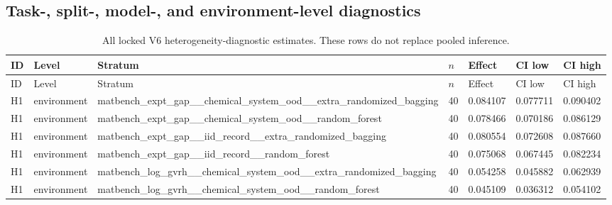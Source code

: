 \documentclass[10pt]{article}
\begin{document}
\begin{landscape}

\section{Task-, split-, model-, and environment-level diagnostics}

\begingroup\scriptsize
\begin{longtable}{L{.35in}L{.6in}L{3.55in}L{.4in}L{.88in}L{.88in}L{.88in}}
\caption{All locked V6 heterogeneity-diagnostic estimates. These rows do not replace pooled inference.}\\
\toprule
ID & Level & Stratum & $n$ & Effect & CI low & CI high\\
\midrule
\endfirsthead
\toprule
ID & Level & Stratum & $n$ & Effect & CI low & CI high\\
\midrule
\endhead
H1 & environment & matbench\_\allowbreak{}expt\_\allowbreak{}gap\_\allowbreak{}\_\allowbreak{}chemical\_\allowbreak{}system\_\allowbreak{}ood\_\allowbreak{}\_\allowbreak{}extra\_\allowbreak{}randomized\_\allowbreak{}bagging & 40 & 0.084107 & 0.077711 & 0.090402\\
H1 & environment & matbench\_\allowbreak{}expt\_\allowbreak{}gap\_\allowbreak{}\_\allowbreak{}chemical\_\allowbreak{}system\_\allowbreak{}ood\_\allowbreak{}\_\allowbreak{}random\_\allowbreak{}forest & 40 & 0.078466 & 0.070186 & 0.086129\\
H1 & environment & matbench\_\allowbreak{}expt\_\allowbreak{}gap\_\allowbreak{}\_\allowbreak{}iid\_\allowbreak{}record\_\allowbreak{}\_\allowbreak{}extra\_\allowbreak{}randomized\_\allowbreak{}bagging & 40 & 0.080554 & 0.072608 & 0.087660\\
H1 & environment & matbench\_\allowbreak{}expt\_\allowbreak{}gap\_\allowbreak{}\_\allowbreak{}iid\_\allowbreak{}record\_\allowbreak{}\_\allowbreak{}random\_\allowbreak{}forest & 40 & 0.075068 & 0.067445 & 0.082234\\
H1 & environment & matbench\_\allowbreak{}log\_\allowbreak{}gvrh\_\allowbreak{}\_\allowbreak{}chemical\_\allowbreak{}system\_\allowbreak{}ood\_\allowbreak{}\_\allowbreak{}extra\_\allowbreak{}randomized\_\allowbreak{}bagging & 40 & 0.054258 & 0.045882 & 0.062939\\
H1 & environment & matbench\_\allowbreak{}log\_\allowbreak{}gvrh\_\allowbreak{}\_\allowbreak{}chemical\_\allowbreak{}system\_\allowbreak{}ood\_\allowbreak{}\_\allowbreak{}random\_\allowbreak{}forest & 40 & 0.045109 & 0.036312 & 0.054102\\

\end{longtable}
\end{landscape}
\end{document}
